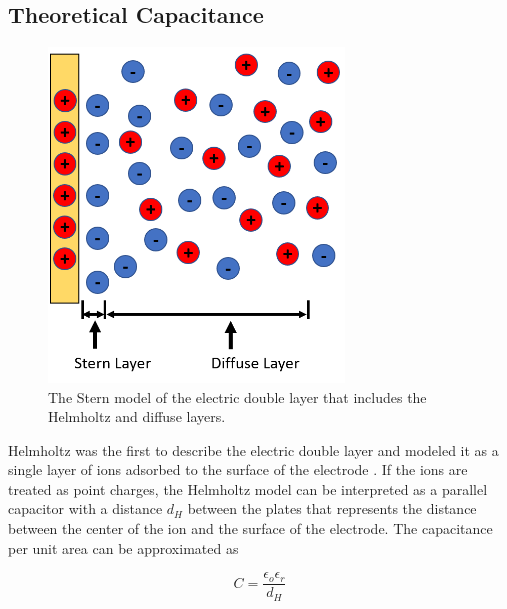 \subsection{Theoretical Capacitance}


\begin{figure}[h]
    \centering
    \includegraphics[width=0.7\textwidth]{images/electricDoubleLayer.png}
    \caption[Stern model of the electric double layer]{The Stern model of the electric double layer that includes the Helmholtz and diffuse layers.}
    \label{fig:electric_double_layer}
\end{figure}

\par Helmholtz was the first to describe the electric double layer and modeled it as a single layer of ions adsorbed to the surface of the electrode \cite{ishai_electrode_2013}. If the ions are treated as point charges, the Helmholtz model can be interpreted as a parallel capacitor with a distance $d_H$ between the plates that represents the distance between the center of the ion and the surface of the electrode. The capacitance per unit area can be approximated as

\begin{equation}
    C = \frac{\epsilon_o\epsilon_r}{d_H}
\end{equation}

